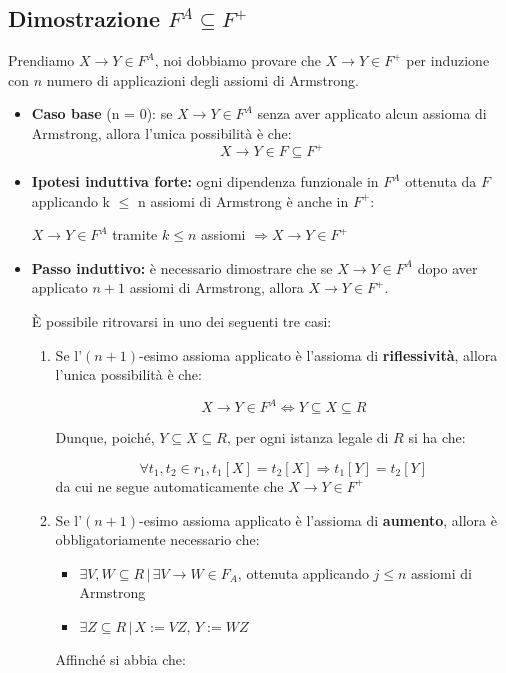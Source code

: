 \documentclass{article}
\begin{document}
\subsection{Dimostrazione $F^{A} \subseteq F^{+}$}
Prendiamo $X \rightarrow Y \in F^{A}$, noi dobbiamo provare che $X \rightarrow Y \in F^{+}$ per induzione con $n$ numero di applicazioni degli assiomi di Armstrong.
\begin{itemize}
  \item \textbf{Caso base} (n = 0): se $X \rightarrow Y \in F^{A}$ senza aver applicato alcun assioma di Armstrong, allora l'unica possibilità è che:
  \[X \rightarrow Y \in F \subseteq F^{+}\]

  \item \textbf{Ipotesi induttiva forte:} ogni dipendenza funzionale in $F^{A}$ ottenuta da $F$
  applicando k $\leq$ n assiomi di Armstrong è anche in $F^{+}$:
  \begin{center}
    $X \rightarrow Y \in F^{A}$ tramite $k \leq n$ assiomi $\Rightarrow X \rightarrow Y \in F^{+}$
  \end{center}
  \item \textbf{Passo induttivo:} è necessario dimostrare che se $X \rightarrow Y \in F^{A}$ dopo aver applicato $n +1$ assiomi di Armstrong, allora $ X \rightarrow Y \in F^{+}$.\par
  È possibile ritrovarsi in uno dei seguenti tre casi:
  \begin{enumerate}
    \item Se l'$(n + 1)$-esimo assioma applicato è l'assioma di \textbf{riflessività}, allora l'unica possibilità è che:

    \[X \rightarrow Y \in F^{A} \Leftrightarrow Y \subseteq X \subseteq R\]

    Dunque, poiché, $Y \subseteq X \subseteq R$, per ogni istanza legale di $R$ si ha che:

    \[\forall t_1, t_2 \in r_{1}, t_1[X] = t_2[X] \Rightarrow t_1[Y] = t_2[Y]\]
    da cui ne segue automaticamente che $X \rightarrow Y \in F^{+}$
    \item Se l'$(n + 1)$-esimo assioma applicato è l'assioma di \textbf{aumento}, allora è obbligatoriamente necessario che:
    \begin{itemize}
      \item $\exists V, W \subseteq R \, | \, \exists V \rightarrow W \in F_{A}$, ottenuta applicando $j \leq n$ assiomi di Armstrong\\

      \item $\exists Z \subseteq R \, | \, X := VZ, \, Y := WZ$\\
    \end{itemize}
      Affinché si abbia che:


\end{enumerate}
\end{itemize}
\end{document}
